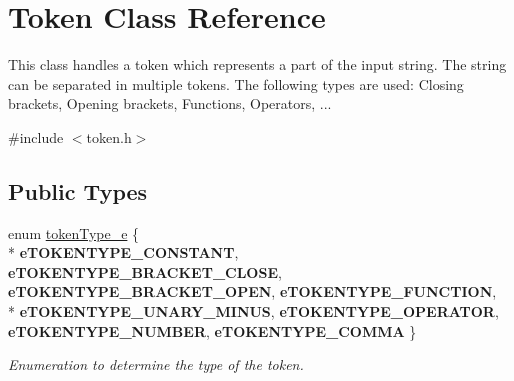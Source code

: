\hypertarget{class_token}{}\section{Token Class Reference}
\label{class_token}


This class handles a token which represents a part of the input string. The string can be separated in multiple tokens. The following types are used\+: Closing brackets, Opening brackets, Functions, Operators, ...  




{\ttfamily \#include $<$token.\+h$>$}

\subsection*{Public Types}
\begin{DoxyCompactItemize}
\item 
\hypertarget{class_token_a706d105bff3282a406a9b218fcee1bfc}{}enum \hyperlink{class_token_a706d105bff3282a406a9b218fcee1bfc}{token\+Type\+\_\+e} \{ \\*
{\bfseries e\+T\+O\+K\+E\+N\+T\+Y\+P\+E\+\_\+\+C\+O\+N\+S\+T\+A\+N\+T}, 
{\bfseries e\+T\+O\+K\+E\+N\+T\+Y\+P\+E\+\_\+\+B\+R\+A\+C\+K\+E\+T\+\_\+\+C\+L\+O\+S\+E}, 
{\bfseries e\+T\+O\+K\+E\+N\+T\+Y\+P\+E\+\_\+\+B\+R\+A\+C\+K\+E\+T\+\_\+\+O\+P\+E\+N}, 
{\bfseries e\+T\+O\+K\+E\+N\+T\+Y\+P\+E\+\_\+\+F\+U\+N\+C\+T\+I\+O\+N}, 
\\*
{\bfseries e\+T\+O\+K\+E\+N\+T\+Y\+P\+E\+\_\+\+U\+N\+A\+R\+Y\+\_\+\+M\+I\+N\+U\+S}, 
{\bfseries e\+T\+O\+K\+E\+N\+T\+Y\+P\+E\+\_\+\+O\+P\+E\+R\+A\+T\+O\+R}, 
{\bfseries e\+T\+O\+K\+E\+N\+T\+Y\+P\+E\+\_\+\+N\+U\+M\+B\+E\+R}, 
{\bfseries e\+T\+O\+K\+E\+N\+T\+Y\+P\+E\+\_\+\+C\+O\+M\+M\+A}
 \}\label{class_token_a706d105bff3282a406a9b218fcee1bfc}

\begin{DoxyCompactList}\small\item\em Enumeration to determine the type of the token. \end{DoxyCompactList}\end{DoxyCompactItemize}
